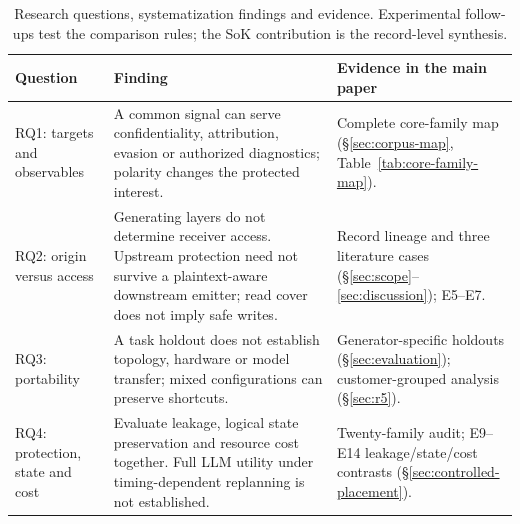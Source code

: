 \begin{table}[t]\centering\footnotesize
\caption{Research questions, systematization findings and evidence. Experimental follow-ups test the comparison rules; the SoK contribution is the record-level synthesis.}\label{tab:rq-findings}
\begin{tabularx}{\textwidth}{@{}p{}YY@{}}\toprule
Question & Finding & Evidence in the main paper\\\midrule
RQ1: targets and observables & A common signal can serve confidentiality, attribution, evasion or authorized diagnostics; polarity changes the protected interest. & Complete core-family map (\S\ref{sec:corpus-map}, Table~\ref{tab:core-family-map}).\\
RQ2: origin versus access & Generating layers do not determine receiver access. Upstream protection need not survive a plaintext-aware downstream emitter; read cover does not imply safe writes. & Record lineage and three literature cases (\S\ref{sec:scope}--\ref{sec:discussion}); E5--E7.\\
RQ3: portability & A task holdout does not establish topology, hardware or model transfer; mixed configurations can preserve shortcuts. & Generator-specific holdouts (\S\ref{sec:evaluation}); customer-grouped analysis (\S\ref{sec:r5}).\\
RQ4: protection, state and cost & Evaluate leakage, logical state preservation and resource cost together. Full LLM utility under timing-dependent replanning is not established. & Twenty-family audit; E9--E14 leakage/state/cost contrasts (\S\ref{sec:controlled-placement}).\\\bottomrule
\end{tabularx}\end{table}
